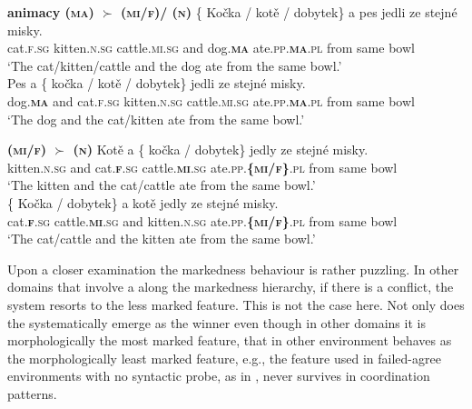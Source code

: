 \documentclass[output=paper,modfontsnewtxmath,hidelinks]{langscibook}
\begin{document}
\ea\label{baseline-anim} \textbf{animacy (\textsc{ma}) $\succ$  ({\textsc{mi}/\textsc{f}})/ (\textsc{n})}
\ea\gll \{\hspace{-2pt} Kočka / kotě / dobytek\} a pes jedli ze stejné misky.\\
{} cat.\textsc{f.sg} {} kitten.\textsc{n.sg} {} cattle.\textsc{mi.sg} and dog.\textsc{\textbf{ma}} ate.\textsc{pp.\textbf{ma}.pl} from same bowl\\
\glt `The cat/kitten/cattle and the dog ate from the same bowl.'\\\hfill {}\smallskip
\ex\gll Pes a \{\hspace{-2pt} kočka / kotě / dobytek\} jedli ze stejné misky.\\
dog.\textsc{\textbf{ma}} and {} cat.\textsc{f.sg} {} kitten.\textsc{n.sg} {} cattle.\textsc{mi.sg} ate.\textsc{pp.\textbf{ma}.pl} from same bowl\\
\glt `The dog and the cat/kitten ate from the same bowl.'\\\hfill {}
\z\z

\ea\label{baseline-inanim} \textbf{ ({\textsc{mi}/\textsc{f}}) $\succ$  (\textsc{n})}
\ea\gll Kotě a \{\hspace{-2pt} kočka / dobytek\} jedly ze stejné misky.\\
kitten.\textsc{n.sg} and {} cat.\textsc{\textbf{f}.sg} {} cattle.\textsc{\textbf{mi}.sg} ate.\textsc{pp.\textbf{\{mi/f\}}.pl} from same bowl\\
\glt `The kitten and the cat/cattle ate from the same bowl.'\\\hfill {}\smallskip
\ex\gll \{\hspace{-2pt} Kočka / dobytek\} a kotě jedly ze stejné misky.\\
{} cat.\textsc{\textbf{f}.sg} {} cattle.\textsc{\textbf{mi}.sg} and kitten.\textsc{n.sg} ate.\textsc{pp.\textbf{\{mi/f\}}.pl} from same bowl\\
\glt `The cat/cattle and the kitten ate from the same bowl.'\\\hfill {}
\z\z

\noindent Upon a closer examination the markedness behaviour is rather puzzling. In other domains that involve a  along the markedness hierarchy, if there is a conflict, the system resorts to the less marked feature. This is not the case here. Not only does the   systematically emerge as the winner even though in other domains it is morphologically the most marked feature,  that in other environment behaves as the morphologically least marked feature, e.g., the feature used in failed-agree environments with no syntactic probe, as in , never survives in coordination  patterns.
\end{document}
